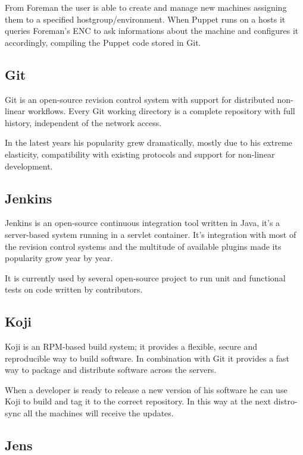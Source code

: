 From Foreman the user is able to create and manage new machines assigning
them to a specified hostgroup/environment. When Puppet runs on a hosts it
queries Foreman's ENC to ask informations about the machine and configures
it accordingly, compiling the Puppet code stored in Git.

\subsection{Git}

Git is an open-source revision control system with support for distributed
non-linear workflows. Every Git working directory is a complete repository
with full history, independent of the network access.

In the latest years his popularity grew dramatically, mostly due to his
extreme elasticity, compatibility with existing protocols and support for
non-linear development.

\subsection{Jenkins}

Jenkins is an open-source continuous integration tool written in Java,
it's a server-based system running in a servlet container. It's
integration with most of the revision control systems and the multitude of
available plugins made its popularity grow year by year.

It is currently used by several open-source project to run unit and
functional tests on code written by contributors.

\subsection{Koji}

Koji is an RPM-based build system; it provides a flexible, secure and
reproducible way to build software. In combination with Git it provides
a fast way to package and distribute software across the servers.

When a developer is ready to release a new version of his software he can
use Koji to build and tag it to the correct repository. In this way at the
next distro-sync all the machines will receive the updates.

\subsection{Jens}

